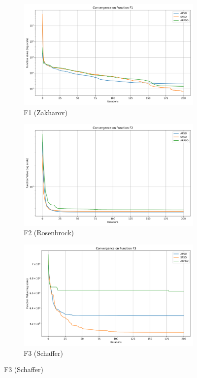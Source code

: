 \documentclass[conference]{IEEEtran}
\begin{document}
\begin{figure}[htbp]
\centering
\begin{subfigure}{0.32\linewidth}
    \centering
    \includegraphics[width=\linewidth]{../plots/cec_bench/cec_convergence_f1.png}
    \caption{F1 (Zakharov)}
    \label{fig:conv_f1}
\end{subfigure}
\hfill
\begin{subfigure}{0.32\linewidth}
    \centering
    \includegraphics[width=\linewidth]{../plots/cec_bench/cec_convergence_f2.png}
    \caption{F2 (Rosenbrock)}
    \label{fig:conv_f2}
\end{subfigure}
\hfill
\begin{subfigure}{0.32\linewidth}
    \centering
    \includegraphics[width=\linewidth]{../plots/cec_bench/cec_convergence_f3.png}
    \caption{F3 (Schaffer)}
    \label{fig:conv_f3}
\end{subfigure}


\end{figure}
\end{document}
